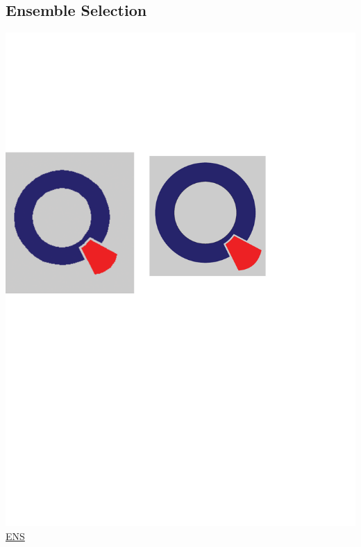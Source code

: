 \documentclass[12pt, a4paper, bibliography=totoc, english]{scrartcl}
\begin{document}
\subsection{Ensemble Selection}
\includegraphics[scale=0.08]{qletlogo}
\textcolor{blue}{\href{https://github.com/JingyiLiu3136/MLFBM/blob/master/ENS/ENS.R}{ENS}}
\end{document}
